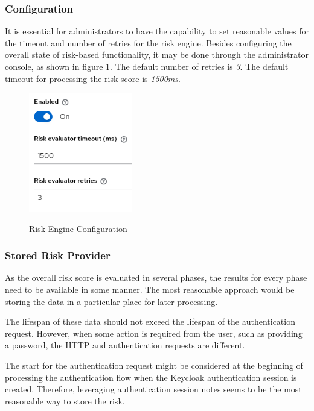 \newpage

\subsubsection{Configuration}
It is essential for administrators to have the capability to set reasonable values for the timeout and number of retries for the risk engine.
Besides configuring the overall state of risk-based functionality, it may be done through the administrator console, as shown in figure \ref{fig:risk-based-enging-config}.
The default number of retries is \textit{3}.
The default timeout for processing the risk score is \textit{1500ms}.

\begin{figure}[htbp]
  \centering
  \includegraphics[width=0.4\textwidth]{img/sections/5-design/risk-based-engine-config.png}
  \label{fig:risk-based-enging-config}
  \caption{Risk Engine Configuration}
\end{figure}

\subsubsection{Stored Risk Provider}
As the overall risk score is evaluated in several phases, the results for every phase need to be available in some manner. 
The most reasonable approach would be storing the data in a particular place for later processing.

The lifespan of these data should not exceed the lifespan of the authentication request.
However, when some action is required from the user, such as providing a password, the HTTP and authentication requests are different.

The start for the authentication request might be considered at the beginning of processing the authentication flow when the Keycloak authentication session is created.
Therefore, leveraging authentication session notes seems to be the most reasonable way to store the risk.

